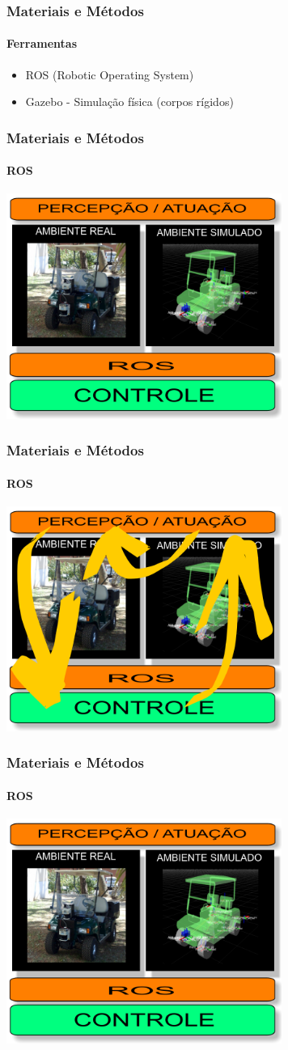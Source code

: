 \documentclass[brazil]{beamer}
\begin{document}
\begin{frame}
\frametitle{Materiais e Métodos}
\framesubtitle{Ferramentas}
\begin{itemize}
\item ROS (Robotic Operating System)
\item Gazebo - Simulação física (corpos rígidos)
\end{itemize}
\end{frame}


\begin{frame}
\frametitle{Materiais e Métodos}
\framesubtitle{ROS}
\includegraphics[width=9cm,keepaspectratio]{ros-slide.png}
\end{frame}


\begin{frame}
\frametitle{Materiais e Métodos}
\framesubtitle{ROS}
\includegraphics[width=9cm,keepaspectratio]{ciclo-rob.png}
\end{frame}


\begin{frame}
\frametitle{Materiais e Métodos}
\framesubtitle{ROS}
\includegraphics[width=9cm,keepaspectratio]{ros-slide.png}
\end{frame}
\end{document}
